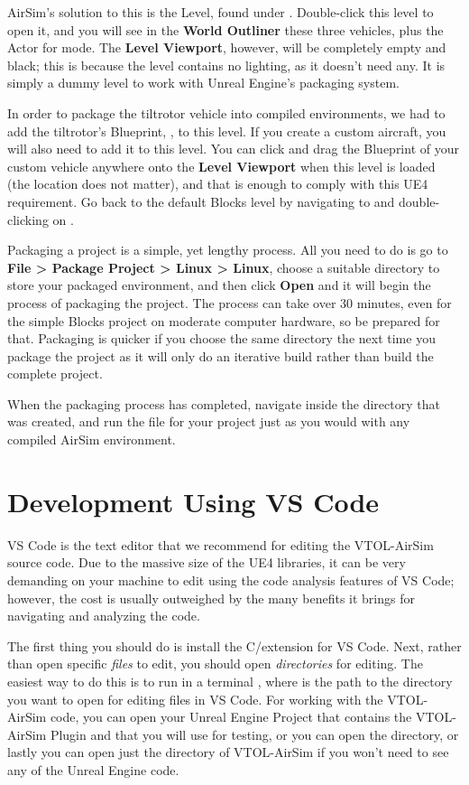 AirSim's solution to this is the  Level, found under . Double-click this level to open it, and you will see in the \textbf{World Outliner} these three vehicles, plus the Actor for  mode. The \textbf{Level Viewport}, however, will be completely empty and black; this is because the level contains no lighting, as it doesn't need any. It is simply a dummy level to work with Unreal Engine's packaging system.

In order to package the tiltrotor vehicle into compiled environments, we had to add the tiltrotor's Blueprint, , to this level. If you create a custom aircraft, you will also need to add it to this level. You can click and drag the Blueprint of your custom vehicle anywhere onto the \textbf{Level Viewport} when this level is loaded (the location does not matter), and that is enough to comply with this UE4 requirement. Go back to the default Blocks level by navigating to  and double-clicking on .

Packaging a project is a simple, yet lengthy process. All you need to do is go to \textbf{File > Package Project > Linux > Linux}, choose a suitable directory to store your packaged environment, and then click \textbf{Open} and it will begin the process of packaging the project. The process can take over 30 minutes, even for the simple Blocks project on moderate computer hardware, so be prepared for that. Packaging is quicker if you choose the same directory the next time you package the project as it will only do an iterative build rather than build the complete project.

When the packaging process has completed, navigate inside the  directory that was created, and run the  file for your project just as you would with any compiled AirSim environment.

\section{Development Using VS Code}
VS Code is the text editor that we recommend for editing the VTOL-AirSim source code. Due to the massive size of the UE4 \CC libraries, it can be very demanding on your machine to edit using the code analysis features of VS Code; however, the cost is usually outweighed by the many benefits it brings for navigating and analyzing the \CC code.

The first thing you should do is install the C/\CC extension for VS Code. Next, rather than open specific \textit{files} to edit, you should open \textit{directories} for editing. The easiest way to do this is to run in a terminal , where  is the path to the directory you want to open for editing files in VS Code. For working with the VTOL-AirSim code, you can open your Unreal Engine Project that contains the VTOL-AirSim Plugin and that you will use for testing, or you can open the  directory, or lastly you can open just the  directory of VTOL-AirSim if you won't need to see any of the Unreal Engine code.

